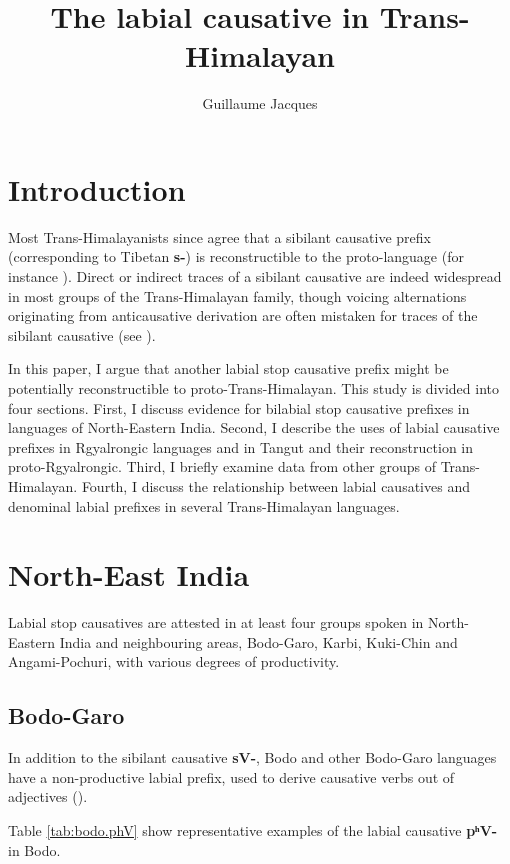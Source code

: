 \documentclass[oneside,a4paper,11pt]{article}
\newcommand{\ipa}[1]{\textbf{{\phon\mbox{#1}}}} %
\begin{document}
\title{The labial causative in Trans-Himalayan}
\author{Guillaume Jacques}
\maketitle
\sloppy


\section{Introduction}
Most Trans-Himalayanists since \citet{conrady1896} agree that a sibilant causative prefix (corresponding to Tibetan \ipa{s-}) is reconstructible to the proto-language (for instance \citealt{wolfenden29outlines, matisoff03}). Direct or indirect traces of a sibilant causative are indeed widespread in most groups of the Trans-Himalayan family, though voicing alternations originating from anticausative derivation are often mistaken for traces of the sibilant causative (see \citealt{jacques15causative}).

In this paper, I argue that another labial stop causative prefix might be potentially reconstructible to proto-Trans-Himalayan. This study is divided into four sections. First,  I discuss evidence for bilabial stop causative prefixes in languages of North-Eastern India. Second, I describe the uses of labial causative prefixes in Rgyalrongic languages and in Tangut and their reconstruction in proto-Rgyalrongic. Third, I briefly examine data from other groups of Trans-Himalayan. Fourth, I discuss the relationship between labial causatives and denominal labial prefixes in several Trans-Himalayan languages.

\section{North-East India}
Labial stop causatives are attested in at least four groups spoken in North-Eastern India and neighbouring areas, Bodo-Garo, Karbi, Kuki-Chin and Angami-Pochuri, with various degrees of productivity.

\subsection{Bodo-Garo}
In addition to the sibilant causative \ipa{sV-}, Bodo and other Bodo-Garo languages have a non-productive labial prefix, used to derive causative verbs out of adjectives (\citealt{delancey15adjectival}).

Table \ref{tab:bodo.phV} show representative examples of the labial causative  \ipa{pʰV-} in Bodo.
\end{document}
